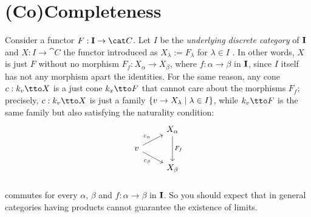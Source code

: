 
\section{(Co)Completeness}

 Consider a functor
\(F : {\bf I} \to \cat C\). Let \(I\) be the {\em underlying discrete
  category} of \({\bf I}\)  and \(X : I \to \cat C\) the functor introduced as
\(X_\lambda := F_\lambda\) for \(\lambda \in I\) . In other words, \(X\) is just \(F\) without no
morphism \(F_f : X_\alpha \to X_\beta\), where
\(f : \alpha \to \beta\) in \({\bf I}\), since \(I\) itself has not any morphism
apart the identities. For the same reason, any cone \(c : k_v \tto X\)
is a just cone \(k_x \tto F\) that cannot care about the morphisms
\(F_f\); precisely, \(c : k_v \tto X\) is just a family
\(\left\{v \to X_\lambda \mid \lambda \in I\right\}\), while \(k_v \tto F\) is the same family but
also satisfying the naturality condition:
\[\begin{tikzcd}[row sep=small]
    & X_\alpha \ar["{F_f}", dd] \\
    v \ar["{c_\alpha}", ur] \ar["{c_\beta}", dr, swap] \\
    & X_\beta \\
  \end{tikzcd}\] commutes for every \(\alpha\), \(\beta\) and
\(f : \alpha \to \beta\) in \({\bf I}\). So you should expect that in general
categories having products cannot guarantee the existence of limits.


